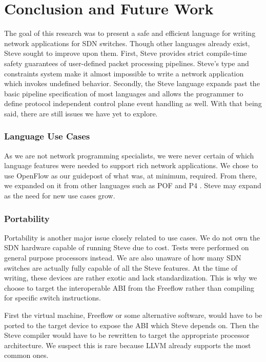 \chapter{ Conclusion and Future Work} \label{ch:conclusion}

The goal of this research was to present a safe and efficient language for writing network applications for SDN switches. Though other languages already exist, Steve sought to improve upon them. First, Steve provides strict compile-time safety guarantees of user-defined packet processing pipelines.
Steve's type and constraints system make it almost impossible to write a network application which invokes undefined behavior.
Secondly, the Steve language expands past the basic pipeline specification of most languages and allows the programmer to define protocol independent control plane event handling as well.
With that being said, there are still issues we have yet to explore.

\subsection{Language Use Cases}

As we are not network programming specialists, we were never certain of which language features were needed to support rich network applications. We chose to use OpenFlow \cite{openflow_spec} as our guidepost of what was, at minimum, required. From there, we expanded on it from other languages such as POF \cite{pof, pof_fis, pof_impl} and P4 \cite{pof, p42014, p4_spec}. Steve may expand as the need for new use cases grow.

\subsection{Portability}

Portability is another major issue closely related to use cases. We do not own the SDN hardware capable of running Steve due to cost. Tests were performed on general purpose processors instead. We are also unaware of how many SDN switches are actually fully capable of all the Steve features. At the time of writing, these devices are rather exotic and lack standardization. This is why we choose to target the interoperable ABI from the Freeflow rather than compiling for specific switch instructions.

First the virtual machine, Freeflow \cite{freeflow_software} or some alternative software, would have to be ported to the target device to expose the ABI which Steve depends on. Then the Steve compiler would have to be rewritten to target the appropriate processor architecture. We suspect this is rare because LLVM already supports the most common ones.

